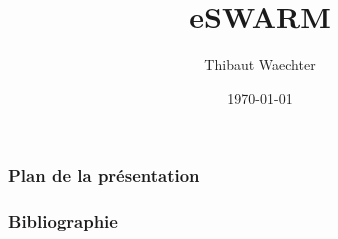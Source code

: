 \documentclass[aspectratio=169]{beamer}
\title{eSWARM}
\author{Thibaut Waechter}
\date{\today}
\begin{document}



\begin{frame}
    \frametitle{Plan de la présentation}
    \tableofcontents[hidesubsections=false]
\end{frame}








\begin{frame}[allowframebreaks]
    \frametitle{Bibliographie}
    \printbibliography
\end{frame}

\appendix

\end{document}
